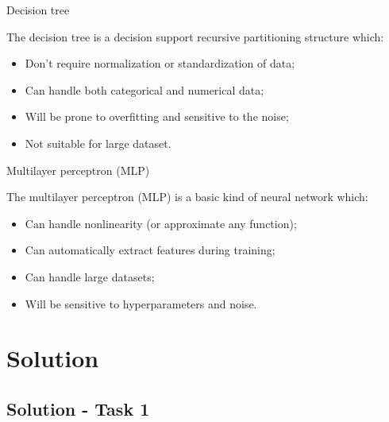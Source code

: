 \documentclass{beamer}
\begin{document}
\begin{frame}{Decision tree}

  The decision tree is a decision support recursive partitioning structure which: \vspace{.25cm}

  \begin{itemize}
    \item Don't require normalization or standardization of data; \vspace{.25cm}
    \item Can handle both categorical and numerical data; \vspace{.25cm}
    \item Will be prone to overfitting and sensitive to the noise; \vspace{.25cm}
    \item Not suitable for large dataset. \vspace{.25cm}
  \end{itemize}

\end{frame}

\begin{frame}{Multilayer perceptron (MLP)}

  The multilayer perceptron (MLP) is a basic kind of neural network which: \vspace{.25cm}

  \begin{itemize}
    \item Can handle nonlinearity (or approximate any function); \vspace{.25cm}
    \item Can automatically extract features during training; \vspace{.25cm}
    \item Can handle large datasets; \vspace{.25cm}
    \item Will be sensitive to hyperparameters and noise. \vspace{.25cm}
  \end{itemize}

\end{frame}

\section{Solution}

\subsection{Solution - Task 1}
\end{document}
